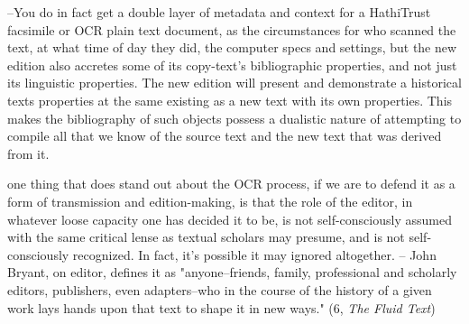 \documentclass[course, english]{Notes}
\newcommand{\n}{\scalebox{2}{\textbf{\framebox{$\aleph$} } } }
\begin{document}
\n --You do in fact get a double layer of metadata and context for a HathiTrust facsimile or OCR plain text document, as the circumstances for who scanned the text, at what time of day they did, the computer specs and settings, but the new edition also accretes some of its copy-text's bibliographic properties, and not just its linguistic properties. The new edition will present and demonstrate a historical texts properties at the same existing as a new text with its own properties. This makes the bibliography of such objects possess a dualistic nature of attempting to compile all that we know of the source text and the new text that was derived from it.

\n one thing that does stand out about the OCR process, if we are to defend it as a form of transmission and edition-making, is that the role of the editor, in whatever loose capacity one has decided it to be, is not self-consciously assumed with the same critical lense as textual scholars may presume, and is not self-consciously recognized. In fact, it's possible it may ignored altogether.
	-- John Bryant, on editor, defines it as "anyone--friends, family, professional and scholarly editors, publishers, even adapters--who in the course of the history of a given work lays hands upon that text to shape it in new ways." (6, \textit{The Fluid Text}) 
\end{document}
